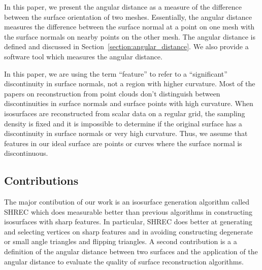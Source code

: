 In this paper, we present the angular distance as a measure
of the difference between the surface orientation of two meshes.
Essentially, the angular distance measures the difference 
between the surface normal at a point on one mesh with the surface normals
on nearby points on the other mesh.
The angular distance is defined and discussed
in Section~\ref{section:angular_distance}.
We also provide a software tool which measures the angular distance.

In this paper, we are using the term ``feature'' to refer 
to a ``significant'' discontinuity in surface normals,
not a region with higher curvature.
Most of the papers on reconstruction from point clouds
don't distinguish between discontinuities in surface normals
and surface points with high curvature.
When isosurfaces are reconstructed from scalar data on a regular grid,
the sampling density is fixed and
it is impossible to determine if the original surface has
a discontinuity in surface normals or very high curvature.
Thus, we assume that features in our ideal surface are
points or curves where the surface normal is discontinuous.


\subsection*{Contributions}

The major contibution of our work is an isosurface generation algorithm
called SHREC which does measurable better than previous algorithms
in constructing isosurfaces with sharp features.
In particular, SHREC does better at generating and selecting vertices 
on sharp features and in avoiding constructing degenerate 
or small angle triangles and flipping triangles.
A second contribution is a a definition of the angular distance 
between two surfaces and the application of the angular distance
to evaluate the quality of surface reconstruction algorithms.
